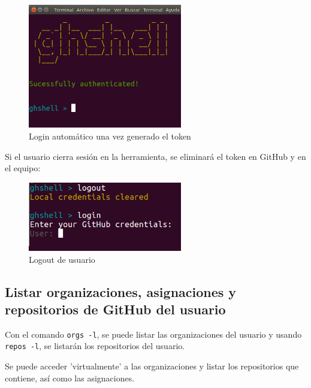 		\begin{figure}[H]
		\begin{center}
		\includegraphics[width=0.6\textwidth]{images/ghshell2-4}
		\caption{Login automático una vez generado el token}
		\label{fig:ghshell2-4}
		\end{center}
		\end{figure}
		
	Si el usuario cierra sesión en la herramienta, se eliminará el token en GitHub y en el equipo:
	
		\begin{figure}[H]
		\begin{center}
		\includegraphics[width=0.6\textwidth]{images/ghshell2-2}
		\caption{Logout de usuario}
		\label{fig:ghshell2-2}
		\end{center}
		\end{figure}

\newpage
\subsection{Listar organizaciones, asignaciones y repositorios de GitHub del usuario}
\label{subsec:3.1.2}   
    
    Con el comando \verb|orgs -l|, se puede listar las organizaciones del usuario y usando \verb|repos -l|, se listarán los repositorios del usuario. 
\bigskip
    
    Se puede acceder 'virtualmente' a las organizaciones y listar los repositorios que contiene, así como las asignaciones.
\bigskip
            
